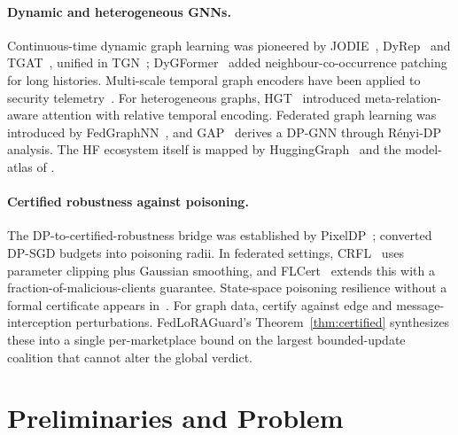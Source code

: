 \documentclass[11pt]{article}
\theoremstyle{plain}
\theoremstyle{definition}
\theoremstyle{remark}
\newcommand{\modelname}{FedLoRAGuard}
\begin{document}
\paragraph{Dynamic and heterogeneous GNNs.}
Continuous-time dynamic graph learning was pioneered by
JODIE~\cite{kumar2019jodie}, DyRep~\cite{trivedi2019dyrep} and
TGAT~\cite{xu2020tgat}, unified in TGN~\cite{rossi2020tgn};
DyGFormer~\cite{yu2023dygformer} added neighbour-co-occurrence
patching for long histories. Multi-scale temporal graph encoders
have been applied to security
telemetry~\cite{anaedevha2026multiscale}. For heterogeneous
graphs, HGT~\cite{hu2020hgt} introduced meta-relation-aware
attention with relative temporal encoding. Federated graph
learning was introduced by
FedGraphNN~\cite{he2021fedgraphnn}, and GAP~\cite{sajadmanesh2023gap}
derives a DP-GNN through R\'enyi-DP analysis. The HF ecosystem
itself is mapped by HuggingGraph~\cite{rahman2025hugginggraph}
and the model-atlas of \citet{horwitz2025atlas}.

\paragraph{Certified robustness against poisoning.}
The DP-to-certified-robustness bridge was established by
PixelDP~\cite{lecuyer2019certified}; \citet{ma2019data} converted
DP-SGD budgets into poisoning radii. In federated settings,
CRFL~\cite{xie2021crfl} uses parameter clipping plus Gaussian
smoothing, and FLCert~\cite{cao2022flcert} extends this with a
fraction-of-malicious-clients guarantee. State-space poisoning
resilience without a formal certificate appears
in~\cite{anaedevha2026mambashield}. For graph data,
\citet{wang2021certgnn,scholten2022randomized} certify against
edge and message-interception perturbations.
\modelname's Theorem~\ref{thm:certified} synthesizes these into a
single per-marketplace bound on the largest bounded-update
coalition that cannot alter the global verdict.

\section{Preliminaries and Problem}
\label{sec:problem}
\end{document}
